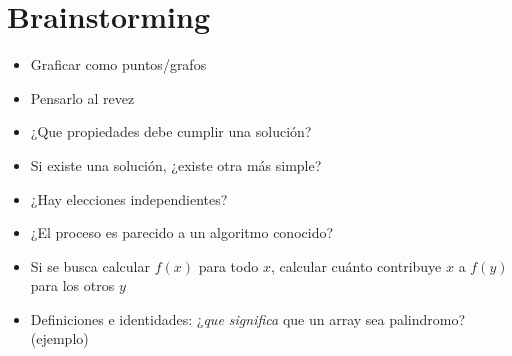 

\def\title{Notebook}
\tableofcontents\newpage















\section{Brainstorming}
    \begin{itemize}
        \item Graficar como puntos/grafos
        \item Pensarlo al revez
        \item ¿Que propiedades debe cumplir una solución?
        \item Si existe una solución, ¿existe otra más simple?
        \item ¿Hay elecciones independientes?
        \item ¿El proceso es parecido a un algoritmo conocido?
        \item Si se busca calcular $f(x)$ para todo $x$, calcular cuánto contribuye $x$ a $f(y)$ para los otros $y$
        \item Definiciones e identidades: ¿\textit{que significa} que un array sea palindromo? (ejemplo)
    \end{itemize}

